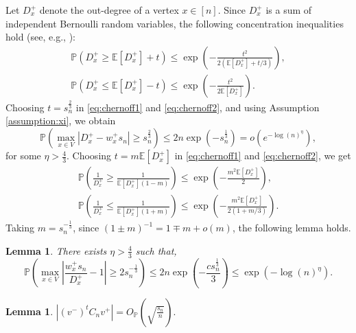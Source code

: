 \documentclass[11pt,oneside]{amsart}
\theoremstyle{plain}
\newtheorem{lemma}[theorem]{Lemma}
\numberwithin{equation}{section}
\newcommand{\E}{\mathbb{E}}
\newcommand{\p}{\mathbb{P}}
\newcommand{\centered}{C_n}
\newcommand{\x}{{{v}}^+}
\newcommand{\y}{{{v}}^-}
\newcommand{\scaling}{s_n}
\newcommand{\Op}{O_{\p}}
\begin{document}
\label{sec:sp-lemmata}
Let $D_x^+$ denote the out-degree of a vertex $x \in [n]$. Since $D_x^+$ is a sum of independent Bernoulli random variables, the following concentration inequalities hold (see, e.g., \cite[Prop.\ 2.21]{hofstad2016random}):
\begin{gather} 
    \label{eq:chernoff1}
        \p(D_x^+ \ge \E[D_x^+]+t)\le \exp\left(-\frac{t^2}{2(\E[D_x^+]+t/3)}\right),\\
    \label{eq:chernoff2}
        \p(D_x^+ \le \E[D_x^+]-t)\le \exp\left(-\frac{t^2}{2\E[D_x^+]}\right).
\end{gather}
Choosing $t= \scaling^{\frac 23}$ in \eqref{eq:chernoff1} and \eqref{eq:chernoff2}, and using  Assumption \ref{assumption:xi}, we obtain
\begin{equation}
    \p(\max_{x \in V}|D_x^+-w_x^+\scaling|\ge \scaling^{\frac 23})\le 2n \exp\left(-\scaling^{\frac13}\right)= o\left(e^{-\log(n)^\eta}\right),
\end{equation}
for some $\eta>\frac 4 3$.
Choosing $t=m\E[{D_x^+}]$ in \eqref{eq:chernoff1} and \eqref{eq:chernoff2}, we get
\begin{gather}
    \p\left(\frac1{D_x^+} \ge \frac{1}{\E[{D_x^+}](1-m)}\right)\le \exp\left(-\frac{m^2\E[{D_x^+}]}{2}\right),\\
    \p\left(\frac1{D_x^+} \le \frac{1}{\E[{D_x^+}](1+m)}\right)\le \exp\left(-\frac{m^2 \E[{D_x^+}]}{2(1+m/3)}\right).
\end{gather}
Taking $m=\scaling^{-\frac13}$, since $(1\pm m)^{-1}=1\mp m+o(m)$, the following lemma holds.
\begin{lemma}  \label{lem:concentration}
There exists $\eta>\frac43$ such that,
\begin{equation}
    \p\left(\max_{x \in V}\left|\frac{w_x^+\scaling}{D_x^+}-1\right|\ge 2\scaling^{-\frac13}\right)\le 2n \exp\left(-\frac{c\scaling^{\frac13}}3\right)\le \exp(-\log(n)^{\eta}).
\end{equation}
\end{lemma}


\begin{lemma}  \label{lem:5}
        $| (\y)^t \centered \x | = \Op\left( \sqrt{\frac{\scaling}{n}}\right).$
\end{lemma}
\end{document}
